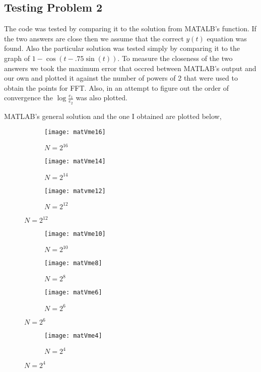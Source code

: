 \documentclass[]{article}
\begin{document}
\begin{flushleft}
\subsection*{Testing Problem 2}
 The code was tested by comparing it to the solution from MATALB's  function. If the two answers are close then we assume that the correct $ y(t) $ equation was found. Also the particular solution was tested simply by comparing it to the graph of $ 1 - \cos(t - .75 \sin(t)) $. To measure the closeness of the two answers we took the maximum error that occred between MATLAB's output and our own and plotted it against the number of powers of 2 that were used to obtain the points for FFT. Also, in an attempt to figure out the order of convergence the $ \log\frac{e_1}{e_2} $ was also plotted. 

MATLAB's general solution and the one I obtained are plotted below, 
\begin{figure}[H]
	\centering
	\begin{subfigure}[b]{0.3\textwidth}
		\texttt{[image: matVme16]}
		\caption{$ N= 2^{16} $}
	\end{subfigure}
	\begin{subfigure}[b]{0.3\textwidth}
		\texttt{[image: matVme14]}
		\caption{$ N= 2^{14} $}
	\end{subfigure}
	\begin{subfigure}[b]{0.3\textwidth}
		\texttt{[image: matvme12]}
		\caption{$ N= 2^{12} $}
	\end{subfigure}
\end{figure}

\begin{figure}[H]
	\centering
	\begin{subfigure}[b]{0.3\textwidth}
		\texttt{[image: matVme10]}
		\caption{$ N= 2^{10} $}
	\end{subfigure}
	\begin{subfigure}[b]{0.3\textwidth}
		\texttt{[image: matVme8]}
		\caption{$ N= 2^{8} $}
	\end{subfigure}
	\begin{subfigure}[b]{0.3\textwidth}
		\texttt{[image: matVme6]}
		\caption{$ N= 2^{6} $}
	\end{subfigure}
\end{figure}
\begin{figure}[H]
	\centering
	\begin{subfigure}[b]{0.3\textwidth}
		\texttt{[image: matVme4]}
		\caption{$ N= 2^{4} $}
	\end{subfigure}
\end{figure}


\end{flushleft}
\end{document}
